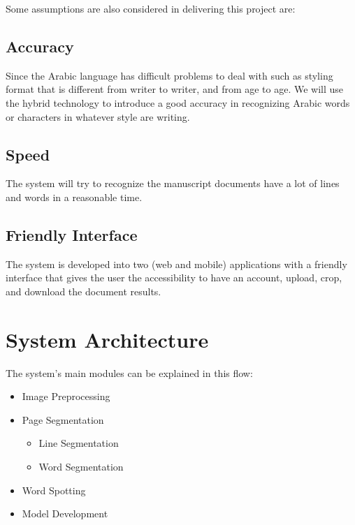 \noindent
Some assumptions are also considered in delivering this project are: 
\subsection{Accuracy}
Since the Arabic language has difficult problems to deal with such as styling format that is different from writer to writer, and from age to age.
We will use the hybrid technology to introduce a good accuracy in recognizing Arabic words or characters in whatever style are writing.

\subsection{Speed}
The system will try to recognize the manuscript documents have a lot of lines and words in a reasonable time. 

\subsection{Friendly Interface}
The system is developed into two (web and mobile) applications with a friendly interface that gives the user the accessibility to have an account, upload, crop, and download the document results.

\section{System Architecture}

The system's main modules can be explained in this flow:
\begin{itemize}[itemsep=1pt, topsep=5pt]
    \item Image Preprocessing
    \item Page Segmentation
    \begin{itemize} 
        \item Line Segmentation
        \item Word Segmentation
    \end{itemize}
    \item Word Spotting
    \item Model Development
\end{itemize}

